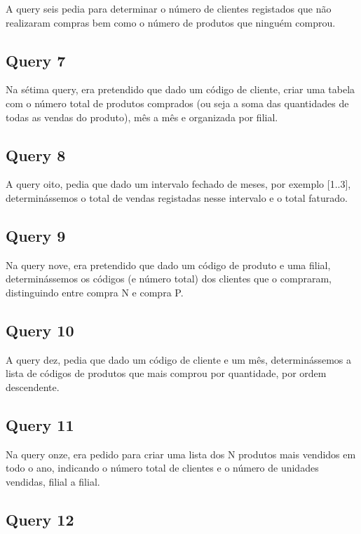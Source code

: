 \documentclass[a4paper,11pt]{report}
\begin{document}
A query seis pedia para determinar o número de clientes registados que não realizaram compras bem como o número de produtos que ninguém comprou.

\subsection*{Query 7}
\label{sec:Query7}

Na sétima query, era pretendido que dado um código de cliente, criar uma tabela com o número total de produtos comprados (ou seja a soma das quantidades de todas as vendas do produto), mês a mês e organizada por filial.

\subsection*{Query 8}
\label{sec:Query8}

A query oito, pedia que dado um intervalo fechado de meses, por exemplo [1..3], determinássemos o total de vendas registadas nesse intervalo e o total faturado.

\subsection*{Query 9}
\label{sec:Query9}

Na query nove, era pretendido que dado um código de produto e uma filial, determinássemos os códigos (e número total) dos clientes que o compraram, distinguindo entre compra N e compra P.

\subsection*{Query 10}
\label{sec:Query10}

A query dez, pedia que dado um código de cliente e um mês, determinássemos a lista de códigos de produtos que mais comprou por quantidade, por ordem descendente.

\subsection*{Query 11}
\label{sec:Query11}

Na query onze, era pedido para criar uma lista dos N produtos mais vendidos em todo o ano, indicando o número total de clientes e o número de unidades vendidas, filial a filial.

\subsection*{Query 12}
\label{sec:Query12}
\end{document}
